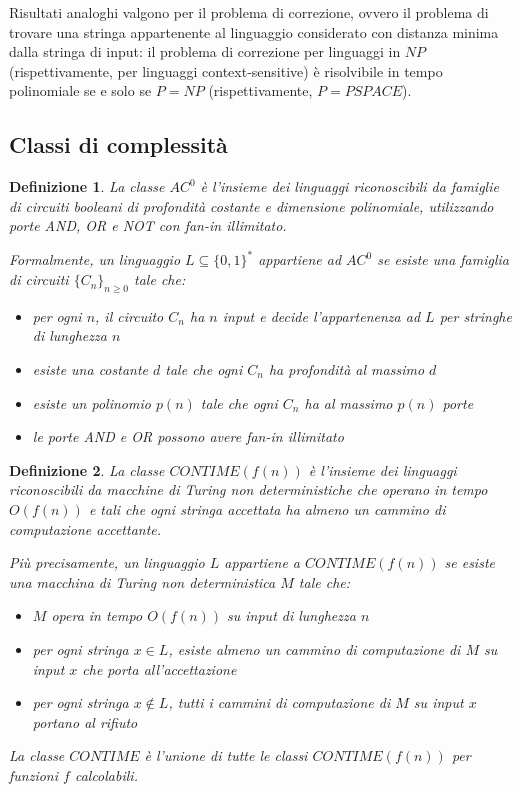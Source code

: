 \documentclass[a4paper,12pt]{report}
\newtheorem{definition}{Definizione}[chapter]
\theoremstyle{propositionstyle}
\begin{document}
    Risultati analoghi valgono per il problema di correzione, ovvero il problema di trovare una stringa appartenente al linguaggio considerato con distanza minima dalla stringa di input: il problema di correzione per linguaggi in $NP$ (rispettivamente, per linguaggi context-sensitive) è risolvibile in tempo polinomiale se e solo se $P = NP$ (rispettivamente, $P = PSPACE$).

    \subsection{Classi di complessità}

    \begin{definition}
        La classe $AC^0$ è l'insieme dei linguaggi riconoscibili da famiglie di circuiti booleani di profondità costante e dimensione polinomiale, utilizzando porte AND, OR e NOT con fan-in illimitato.

        Formalmente, un linguaggio $L \subseteq \{0,1\}^*$ appartiene ad $AC^0$ se esiste una famiglia di circuiti $\{C_n\}_{n \geq 0}$ tale che:
        \begin{itemize}
            \item per ogni $n$, il circuito $C_n$ ha $n$ input e decide l'appartenenza ad $L$ per stringhe di lunghezza $n$
            \item esiste una costante $d$ tale che ogni $C_n$ ha profondità al massimo $d$
            \item esiste un polinomio $p(n)$ tale che ogni $C_n$ ha al massimo $p(n)$ porte
            \item le porte AND e OR possono avere fan-in illimitato
        \end{itemize}
    \end{definition}

    \begin{definition}
        La classe $CONTIME(f(n))$ è l'insieme dei linguaggi riconoscibili da macchine di Turing non deterministiche che operano in tempo $O(f(n))$ e tali che ogni stringa accettata ha almeno un cammino di computazione accettante.

        Più precisamente, un linguaggio $L$ appartiene a $CONTIME(f(n))$ se esiste una macchina di Turing non deterministica $M$ tale che:
        \begin{itemize}
            \item $M$ opera in tempo $O(f(n))$ su input di lunghezza $n$
            \item per ogni stringa $x \in L$, esiste almeno un cammino di computazione di $M$ su input $x$ che porta all'accettazione
            \item per ogni stringa $x \notin L$, tutti i cammini di computazione di $M$ su input $x$ portano al rifiuto
        \end{itemize}

        La classe $CONTIME$ è l'unione di tutte le classi $CONTIME(f(n))$ per funzioni $f$ calcolabili.
    \end{definition}
\end{document}
